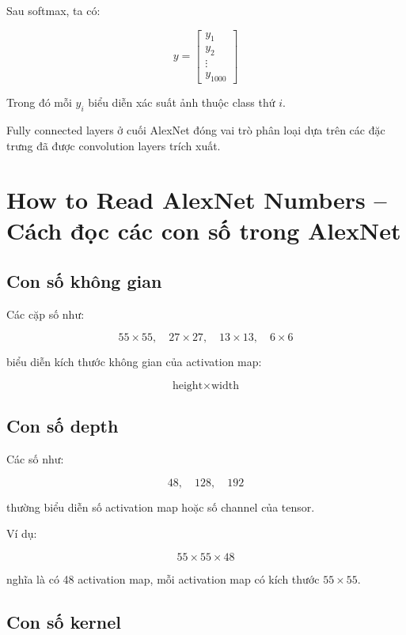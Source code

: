 Sau softmax, ta có:

\[
    y =
    \begin{bmatrix}
    y_1\\
    y_2\\
    \vdots\\
    y_{1000}
    \end{bmatrix}
\]

Trong đó mỗi $y_i$ biểu diễn xác suất ảnh thuộc class thứ $i$.

\begin{ghinho}
Fully connected layers ở cuối AlexNet đóng vai trò phân loại dựa trên các đặc trưng đã được convolution layers trích xuất.
\end{ghinho}

\section{How to Read AlexNet Numbers -- Cách đọc các con số trong AlexNet}

\subsection{Con số không gian}

Các cặp số như:

\[
    55\times55,\quad 27\times27,\quad 13\times13,\quad 6\times6
\]

biểu diễn kích thước không gian của activation map:

\[
    \text{height}\times\text{width}
\]

\subsection{Con số depth}

Các số như:

\[
    48,\quad 128,\quad 192
\]

thường biểu diễn số activation map hoặc số channel của tensor.

Ví dụ:

\[
    55\times55\times48
\]

nghĩa là có 48 activation map, mỗi activation map có kích thước $55\times55$.

\subsection{Con số kernel}

